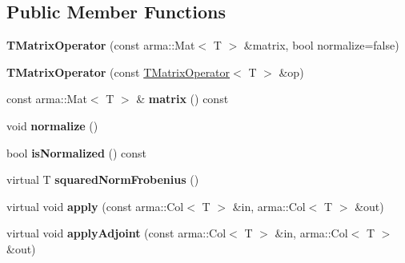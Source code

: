 \subsection*{Public Member Functions}
\begin{DoxyCompactItemize}
\item 
{\bfseries T\+Matrix\+Operator} (const arma\+::\+Mat$<$ T $>$ \&matrix, bool normalize=false)\hypertarget{classkl1p_1_1TMatrixOperator_a14f84aebf5010de974a34e1444e5347b}{}\label{classkl1p_1_1TMatrixOperator_a14f84aebf5010de974a34e1444e5347b}

\item 
{\bfseries T\+Matrix\+Operator} (const \hyperlink{classkl1p_1_1TMatrixOperator}{T\+Matrix\+Operator}$<$ T $>$ \&op)\hypertarget{classkl1p_1_1TMatrixOperator_a23c48117c83eb7cfda9b8f07e392d02a}{}\label{classkl1p_1_1TMatrixOperator_a23c48117c83eb7cfda9b8f07e392d02a}

\item 
const arma\+::\+Mat$<$ T $>$ \& {\bfseries matrix} () const \hypertarget{classkl1p_1_1TMatrixOperator_a77fda47c0d475c967ecfeb6339754623}{}\label{classkl1p_1_1TMatrixOperator_a77fda47c0d475c967ecfeb6339754623}

\item 
void {\bfseries normalize} ()\hypertarget{classkl1p_1_1TMatrixOperator_ad4b6c5ecd8c3c215bce8f32ba676a876}{}\label{classkl1p_1_1TMatrixOperator_ad4b6c5ecd8c3c215bce8f32ba676a876}

\item 
bool {\bfseries is\+Normalized} () const \hypertarget{classkl1p_1_1TMatrixOperator_a68609f8d727b36bc52529548fead572a}{}\label{classkl1p_1_1TMatrixOperator_a68609f8d727b36bc52529548fead572a}

\item 
virtual T {\bfseries squared\+Norm\+Frobenius} ()\hypertarget{classkl1p_1_1TMatrixOperator_a4453927ecff51de46cf5402d4b8827fd}{}\label{classkl1p_1_1TMatrixOperator_a4453927ecff51de46cf5402d4b8827fd}

\item 
virtual void {\bfseries apply} (const arma\+::\+Col$<$ T $>$ \&in, arma\+::\+Col$<$ T $>$ \&out)\hypertarget{classkl1p_1_1TMatrixOperator_afc0988d50d36a7de247881edb2e1f2a9}{}\label{classkl1p_1_1TMatrixOperator_afc0988d50d36a7de247881edb2e1f2a9}

\item 
virtual void {\bfseries apply\+Adjoint} (const arma\+::\+Col$<$ T $>$ \&in, arma\+::\+Col$<$ T $>$ \&out)\hypertarget{classkl1p_1_1TMatrixOperator_a10a7f5ea33ce73851078fcc9aa5ef773}{}\label{classkl1p_1_1TMatrixOperator_a10a7f5ea33ce73851078fcc9aa5ef773}


\end{DoxyCompactItemize}
